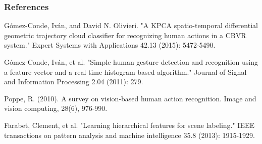 \documentclass{beamer}
\begin{document}
\begin{frame}
\frametitle{References}
\footnotesize{
\begin{thebibliography}{99} 
     Gómez-Conde, Iván, and David N. Olivieri. "A KPCA spatio-temporal differential geometric trajectory cloud classifier for recognizing human actions in a CBVR system." Expert Systems with Applications 42.13 (2015): 5472-5490.
    
        Gómez-Conde, Iván, et al. "Simple human gesture detection and recognition using a feature vector and a real-time histogram based algorithm." Journal of Signal and Information Processing 2.04 (2011): 279.
        
         Poppe, R. (2010). A survey on vision-based human action recognition. Image and vision computing, 28(6), 976-990.
        
         Farabet, Clement, et al. "Learning hierarchical features for scene labeling." IEEE transactions on pattern analysis and machine intelligence 35.8 (2013): 1915-1929.
        
        
        
        
        
        
    
\end{thebibliography}
}
\end{frame}


\begin{frame}
\titlepage
\end{frame}

\end{document}
